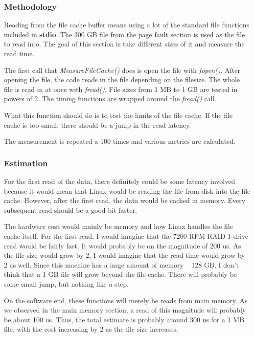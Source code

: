 \documentclass[paper=a4, fontsize=11pt]{scrartcl}
\numberwithin{equation}{section}        %
\numberwithin{figure}{section}          %
\numberwithin{table}{section}               %
\begin{document}
\subsubsection{Methodology}

Reading from the file cache buffer means using a lot of the standard file functions included in \textbf{stdio}.  The 300 GB file from the page fault section is used as the file to read into.  The goal of this section is take different sizes of it and measure the read time.

The first call that \textit{MeasureFileCache()} does is open the file with \textit{fopen()}.  After opening the file, the code reads in the file depending on the filesize.  The whole file is read in at once with \textit{fread()}.  File sizes from 1 MB to 1 GB are tested in powers of 2.  The timing functions are wrapped around the \textit{fread()} call.

What this function should do is to test the limits of the file cache.  If the file cache is too small, there should be a jump in the read latency.

The measurement is repeated a 100 times and various metrics are calculated.

\subsubsection{Estimation}

For the first read of the data, there definitely could be some latency involved because it would mean that Linux would be reading the file from disk into the file cache.  However, after the first read, the data would be cached in memory.  Every subsequent read should be a good bit faster.

The hardware cost would mainly be memory and how Linux handles the file cache itself.  For the first read, I would imagine that the 7200 RPM RAID 1 drive read would be fairly fast.  It would probably be on the magnitude of 200 us.  As the file size would grow by 2, I would imagine that the read time would grow by 2 as well.  Since this machine has a large amount of memory ~ 128 GB, I don't think that a 1 GB file will grow beyond the file cache.  There will probably be some small jump, but nothing like a step.

On the software end, these functions will merely be reads from main memory.  As we observed in the main memory section, a read of this magnitude will probably be about 100 us.  Thus, the total estimate is probably around 300 us for a 1 MB file, with the cost increasing by 2 as the file size increases.
\end{document}
